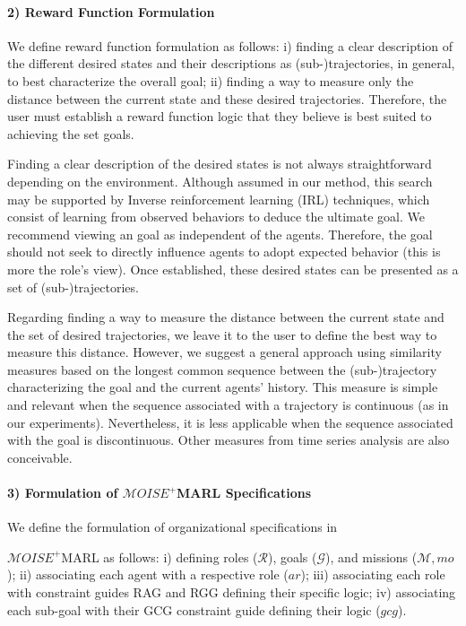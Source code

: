\documentclass[pdflatex,sn-mathphys-num]{sn-jnl}%
\theoremstyle{thmstyleone}%
\theoremstyle{thmstyletwo}%
\theoremstyle{thmstylethree}%
\begin{document}
\paragraph{\textbf{2) Reward Function Formulation}} \quad

\noindent We define reward function formulation as follows: \quad i) finding a clear description of the different desired states and their descriptions as (sub-)trajectories, in general, to best characterize the overall goal; \quad ii) finding a way to measure only the distance between the current state and these desired trajectories. Therefore, the user must establish a reward function logic that they believe is best suited to achieving the set goals.

Finding a clear description of the desired states is not always straightforward depending on the environment. Although assumed in our method, this search may be supported by Inverse reinforcement learning (IRL) techniques, which consist of learning from observed behaviors to deduce the ultimate goal. We recommend viewing an goal as independent of the agents. Therefore, the goal should not seek to directly influence agents to adopt expected behavior (this is more the role's view). Once established, these desired states can be presented as a set of (sub-)trajectories.

Regarding finding a way to measure the distance between the current state and the set of desired trajectories, we leave it to the user to define the best way to measure this distance. However, we suggest a general approach using similarity measures based on the longest common sequence between the (sub-)trajectory characterizing the goal and the current agents' history. This measure is simple and relevant when the sequence associated with a trajectory is continuous (as in our experiments). Nevertheless, it is less applicable when the sequence associated with the goal is discontinuous. Other measures from time series analysis are also conceivable.

\paragraph{\textbf{3) Formulation of $\mathcal{M}OISE^+$MARL Specifications}} \quad

\noindent We define the formulation of organizational specifications in

\noindent $\mathcal{M}OISE^+$MARL as follows: \quad i) defining roles ($\mathcal{R}$), goals ($\mathcal{G}$), and missions ($\mathcal{M}, mo$); ii) associating each agent with a respective role ($ar$); \quad iii) associating each role with constraint guides RAG and RGG defining their specific logic; iv) associating each sub-goal with their GCG constraint guide defining their logic ($gcg$).
\end{document}
